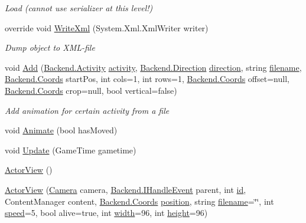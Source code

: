 \begin{DoxyCompactItemize}
\begin{DoxyCompactList}\small\item\em Load (cannot use serializer at this level!) \end{DoxyCompactList}\item 
override void \hyperlink{class_gruppe22_1_1_client_1_1_actor_view_af04d89d3988da620d7b092055f64b37b}{Write\-Xml} (System.\-Xml.\-Xml\-Writer writer)
\begin{DoxyCompactList}\small\item\em Dump object to X\-M\-L-\/file \end{DoxyCompactList}\item 
void \hyperlink{class_gruppe22_1_1_client_1_1_actor_view_ae79845d8f30b5eaae104757b85043386}{Add} (\hyperlink{namespace_gruppe22_1_1_backend_aaa25d27da5307e9abb21f9f09b528f67}{Backend.\-Activity} \hyperlink{class_gruppe22_1_1_client_1_1_actor_view_af7f1f3741a7266476953b693df0067a2}{activity}, \hyperlink{namespace_gruppe22_1_1_backend_a2d53d5d14b8ea0951ba6971e5da1ebf5}{Backend.\-Direction} \hyperlink{class_gruppe22_1_1_client_1_1_actor_view_ad51208acd18670716bde6c746b86655b}{direction}, string \hyperlink{class_gruppe22_1_1_client_1_1_tile_set_afce49a3941b2d4a360990f9847282da1}{filename}, \hyperlink{class_gruppe22_1_1_backend_1_1_coords}{Backend.\-Coords} start\-Pos, int cols=1, int rows=1, \hyperlink{class_gruppe22_1_1_backend_1_1_coords}{Backend.\-Coords} offset=null, \hyperlink{class_gruppe22_1_1_backend_1_1_coords}{Backend.\-Coords} crop=null, bool vertical=false)
\begin{DoxyCompactList}\small\item\em Add animation for certain activity from a file \end{DoxyCompactList}\item 
void \hyperlink{class_gruppe22_1_1_client_1_1_actor_view_aa5ff2045ed28649dfe11428be9c39660}{Animate} (bool has\-Moved)
\item 
void \hyperlink{class_gruppe22_1_1_client_1_1_actor_view_ae9b9945e735d77eba0a5118bcbb93596}{Update} (Game\-Time gametime)
\item 
\hyperlink{class_gruppe22_1_1_client_1_1_actor_view_a84160789d74c4206e3adbf18078c62a8}{Actor\-View} ()
\item 
\hyperlink{class_gruppe22_1_1_client_1_1_actor_view_a7a97196d62da28a51d533aa167e00c2f}{Actor\-View} (\hyperlink{class_gruppe22_1_1_client_1_1_camera}{Camera} camera, \hyperlink{interface_gruppe22_1_1_backend_1_1_i_handle_event}{Backend.\-I\-Handle\-Event} parent, int \hyperlink{class_gruppe22_1_1_client_1_1_actor_view_a6468d36affd0a3d63e3873cb201c4b3e}{id}, Content\-Manager content, \hyperlink{class_gruppe22_1_1_backend_1_1_coords}{Backend.\-Coords} \hyperlink{class_gruppe22_1_1_client_1_1_actor_view_a5a4e1de85966801e99c5fb08f7d342ca}{position}, string \hyperlink{class_gruppe22_1_1_client_1_1_tile_set_afce49a3941b2d4a360990f9847282da1}{filename}=\char`\"{}\char`\"{}, int \hyperlink{class_gruppe22_1_1_client_1_1_actor_view_a3c41306652c4ca9d9ab01b32445ce7da}{speed}=5, bool alive=true, int \hyperlink{class_gruppe22_1_1_client_1_1_tile_set_aff0371f9e4071f24de16612c2066ad5b}{width}=96, int \hyperlink{class_gruppe22_1_1_client_1_1_tile_set_a12343c861014c3631e1a40dfeef20312}{height}=96)
\end{DoxyCompactItemize}
